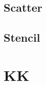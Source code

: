 \documentclass[12px,oz]{report}
\begin{document}
	\section{Scatter}
	\label{sec-scatter}
	
	
	\section{Stencil}
	\label{sec-stencil}
	

\chapter{KK}

\cite{PANDA}



\end{document}
